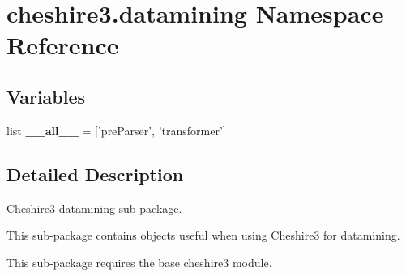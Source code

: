 \hypertarget{namespacecheshire3_1_1datamining}{\section{cheshire3.\-datamining Namespace Reference}
\label{namespacecheshire3_1_1datamining}
}
\subsection*{Variables}
\begin{DoxyCompactItemize}
\item 
\hypertarget{namespacecheshire3_1_1datamining_af94a4068f96230d5bcc248e731058ef9}{list {\bfseries \-\_\-\-\_\-all\-\_\-\-\_\-} = \mbox{[}'pre\-Parser', 'transformer'\mbox{]}}\label{namespacecheshire3_1_1datamining_af94a4068f96230d5bcc248e731058ef9}

\end{DoxyCompactItemize}


\subsection{Detailed Description}
\begin{DoxyVerb}Cheshire3 datamining sub-package.

This sub-package contains objects useful when using Cheshire3 for datamining.

This sub-package requires the base cheshire3 module.
\end{DoxyVerb}
 
